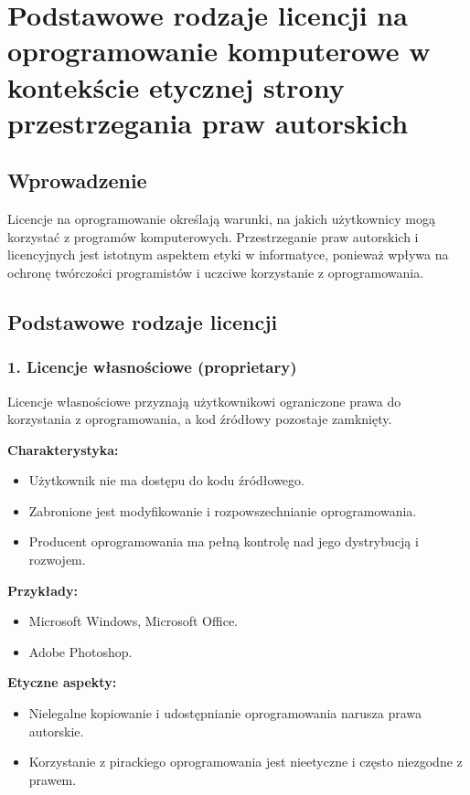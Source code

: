 \section{Podstawowe rodzaje licencji na oprogramowanie komputerowe w kontekście etycznej strony przestrzegania praw autorskich}

\subsection{Wprowadzenie}
Licencje na oprogramowanie określają warunki, na jakich użytkownicy mogą korzystać z programów komputerowych. Przestrzeganie praw autorskich i licencyjnych jest istotnym aspektem etyki w informatyce, ponieważ wpływa na ochronę twórczości programistów i uczciwe korzystanie z oprogramowania.

\subsection{Podstawowe rodzaje licencji}

\subsubsection{1. Licencje własnościowe (proprietary)}
Licencje własnościowe przyznają użytkownikowi ograniczone prawa do korzystania z oprogramowania, a kod źródłowy pozostaje zamknięty.

\textbf{Charakterystyka:}
\begin{itemize}
    \item Użytkownik nie ma dostępu do kodu źródłowego.
    \item Zabronione jest modyfikowanie i rozpowszechnianie oprogramowania.
    \item Producent oprogramowania ma pełną kontrolę nad jego dystrybucją i rozwojem.
\end{itemize}

\textbf{Przykłady:}
\begin{itemize}
    \item Microsoft Windows, Microsoft Office.
    \item Adobe Photoshop.
\end{itemize}

\textbf{Etyczne aspekty:}
\begin{itemize}
    \item Nielegalne kopiowanie i udostępnianie oprogramowania narusza prawa autorskie.
    \item Korzystanie z pirackiego oprogramowania jest nieetyczne i często niezgodne z prawem.
\end{itemize}

